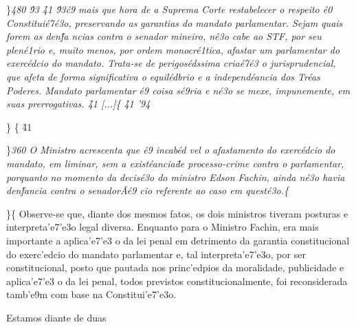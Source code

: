 \par \}\pard \ltrpar{}\qj {}\sl480\widctlpar\wrapdefault\aspalpha\aspnum\fahang\adjustright{}  {\rtlch{}  \ltrch{}  \'93}{
\rtlch{}  \ltrch{} \f41 \'93\'c9 mais que hora de a Suprema Corte restabelecer o respeito \'e0 Constitui\'e7\'e3o, preservando as garantias do mandato parlamentar. Sejam quais forem as den\'fa
ncias contra o senador mineiro, n\'e3o cabe ao STF, por seu plen\'e1rio e, muito menos, por ordem monocr\'e1tica, afastar um parlamentar do exerc\'edcio do mandato. Trata-se de perigos\'edssima cria\'e7\'e3
o jurisprudencial, que afeta de forma significativa o equil\'edbrio e a independ\'eancia dos Tr\'eas Poderes. Mandato parlamentar \'e9 coisa s\'e9ria e n\'e3o se mexe, impunemente, em suas prerrogativas. }{\rtlch{}  \ltrch{} 
\f41 [...]}\{\rtlch{} 
\ltrch{} \f41 '94
\par \}\pard \ltrpar{}\ql {}\widctlpar\wrapdefault\aspalpha\aspnum\fahang\adjustright{}
 \{\rtlch{}  \ltrch{}
\f41
\par \}\pard \ltrpar{}\qj {}\sl360\widctlpar\wrapdefault\aspalpha\aspnum\fahang\adjustright{}  {\rtlch{}  \ltrch{}  O Ministro acrescenta que \'e9 incab\'ed
vel o afastamento do exerc\'edcio do mandato, em liminar, sem a exist\'eancia\~de processo-crime contra o parlamentar, porquanto no momento da decis\'e3o do ministro Edson Fachin, ainda n\'e3o havia den\'fancia contra o senador\~A\'e9
cio referente ao caso em quest\'e3o.}\{\rtlch{}  \ltrch{}
 \par \}\{\rtlch{}  \ltrch{}
 Observe-se que, diante dos mesmos fatos, os dois
ministros tiveram posturas e interpreta'e7'e3o legal diversa. Enquanto
para o Ministro Fachin, era mais importante a aplica'e7'e3 o da lei
penal em detrimento da garantia constitucional do exerc'edcio do mandato
parlamentar e, tal interpreta'e7'e3o, por ser constitucional, posto que
pautada nos princ'edpios da moralidade, publicidade e aplica'e7'e3 o da
lei penal, todos previstos constitucionalmente, foi reconsiderada
tamb'e9m com base na Constitui'e7'e3o. \par Estamos diante de duas
